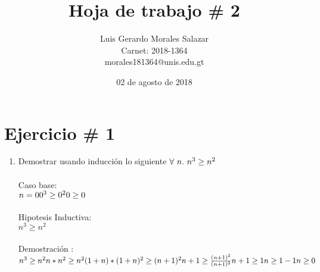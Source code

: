 \documentclass{article}
\title{Hoja de trabajo \# 2}
\author{Luis Gerardo Morales Salazar \\Carnet: 2018-1364\\ morales181364@unis.edu.gt}
\date{02 de agosto de 2018}
\begin{document}
\maketitle
\section{Ejercicio \# 1}

\begin{enumerate}
\item Demostrar usando inducci\'on lo siguiente $\\ \forall\ n.\ n^3\geq n^2$
\\\\Caso base:\\ $n=0 \\ 0^3\geq 0^2 \\ 0\geq 0$ 
\\\\Hipotesis Inductiva: \\ $ n^3\geq n^2\ $ 
\\\\Demostraci\'on :
\\$ n^3\geq n^2\ \\ n*n^2\geq n^2\ \\ (1+n)*(1+n)^2\geq (n+1)^2\ \\ n+1\geq \frac{(n+1)^2}{(n+1)^2}\ \\ n+1\geq 1 \\ n\geq 1-1 \\ n\geq 0 \ $ \end{enumerate}

\end{document}
